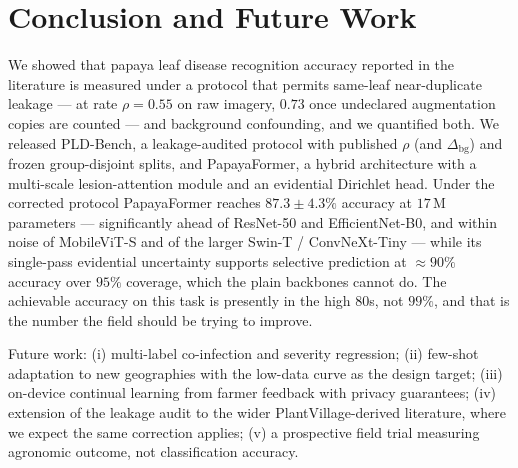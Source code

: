 \documentclass[10pt,twocolumn,a4paper]{article}
\begin{document}
\section{Conclusion and Future Work}
\label{sec:conclusion}
We showed that papaya leaf disease recognition accuracy reported in the literature is measured under a protocol that permits same-leaf near-duplicate leakage --- at rate $\rho=0.55$ on raw imagery, $0.73$ once undeclared augmentation copies are counted --- and background confounding, and we quantified both. We released PLD-Bench, a leakage-audited protocol with published $\rho$ (and $\Delta_{\text{bg}}$) and frozen group-disjoint splits, and PapayaFormer, a hybrid architecture with a multi-scale lesion-attention module and an evidential Dirichlet head. Under the corrected protocol PapayaFormer reaches $87.3 \pm 4.3\%$ accuracy at $17$\,M parameters --- significantly ahead of ResNet-50 and EfficientNet-B0, and within noise of MobileViT-S and of the larger Swin-T / ConvNeXt-Tiny --- while its single-pass evidential uncertainty supports selective prediction at $\approx90\%$ accuracy over $95\%$ coverage, which the plain backbones cannot do. The achievable accuracy on this task is presently in the high $80$s, not $99\%$, and that is the number the field should be trying to improve.

Future work: (i) multi-label co-infection and severity regression; (ii) few-shot adaptation to new geographies with the low-data curve as the design target; (iii) on-device continual learning from farmer feedback with privacy guarantees; (iv) extension of the leakage audit to the wider PlantVillage-derived literature, where we expect the same correction applies; (v) a prospective field trial measuring agronomic outcome, not classification accuracy.

\end{document}
